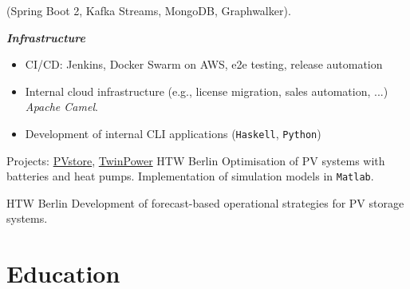 \documentclass[11pt,a4paper,ngerman,sans]{moderncv}
\begin{document}
{\begin{itemize}
\begin{itemize}
          (Spring Boot 2, Kafka Streams, MongoDB, Graphwalker).
          \\
      \end{itemize}
  \end{itemize}
  \textbf{\emph{Infrastructure}\newline}
  \begin{itemize}
    \item CI/CD: Jenkins, Docker Swarm on AWS, e2e testing, release automation
    \item Internal cloud infrastructure (e.g., license migration, sales automation, ...)\newline
      \emph{Apache Camel}.	
    \item Development of internal CLI applications (\texttt{Haskell}, \texttt{Python})
      \\
  \end{itemize}
}
{}


  {Projects: 
    \href{https://pvspeicher.htw-berlin.de/forschungsprojekte/pv-store/}{PVstore},
    \href{https://pvspeicher.htw-berlin.de/forschungsprojekte/twinpower/}{TwinPower}
  }{HTW Berlin}{}
  {Optimisation of PV systems with batteries and heat pumps.\newline
  Implementation of simulation models in \texttt{Matlab}.
  }{}

{HTW Berlin}{}
{Development of forecast-based operational strategies for PV storage systems.}
{}

\clearpage
\section{Education}


\end{document}
